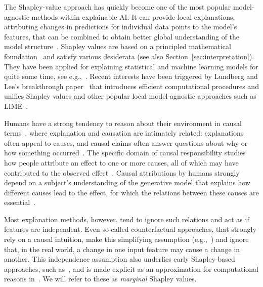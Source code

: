 \documentclass{article}
\begin{document}
The Shapley-value approach has quickly become one of the most popular model-agnostic methods within explainable AI. It can provide local explanations, attributing changes in predictions for individual data points to the model's features, that can be combined to obtain better global understanding of the model structure~\cite{lundberg2020local}. Shapley values are based on a principled mathematical foundation~\cite{shapley1953value} and satisfy various desiderata (see also Section~\ref{sec:interpretation}). They have been applied for explaining statistical and machine learning models for quite some time, see e.g.,~\cite{lipovetsky2001analysis,vstrumbelj2014explaining}. Recent interests have been triggered by Lundberg and Lee's breakthrough paper~\cite{lundberg2017unified} that introduces efficient computational procedures and unifies Shapley values and other popular local model-agnostic approaches such as LIME~\cite{ribeiro2016should}.

Humans have a strong tendency to reason about their environment in causal terms~\cite{sloman2005causal}, where explanation and causation are intimately related: explanations often appeal to causes, and causal claims often answer questions about why or how something occurred~\cite{lombrozo2017causal}. The specific domain of causal responsibility studies how people attribute an effect to one or more causes, all of which may have contributed to the observed effect~\cite{sober1988apportioning}. Causal attributions by humans strongly depend on a subject's understanding of the generative model that explains how different causes lead to the effect, for which the relations between these causes are essential~\cite{gerstenberg2012noisy}.


Most explanation methods, however, tend to ignore such relations and act as if features are independent. Even so-called counterfactual approaches, that strongly rely on a causal intuition, make this simplifying assumption (e.g.,~\cite{wachter2017counterfactual}) and ignore that, in the real world, a change in one input feature may cause a change in another. This independence assumption also underlies early Shapley-based approaches, such as~\cite{vstrumbelj2014explaining,datta2016algorithmic}, and is made explicit as an approximation for computational reasons in~\cite{lundberg2017unified}. We will refer to these as {\em marginal} Shapley values.
\end{document}
